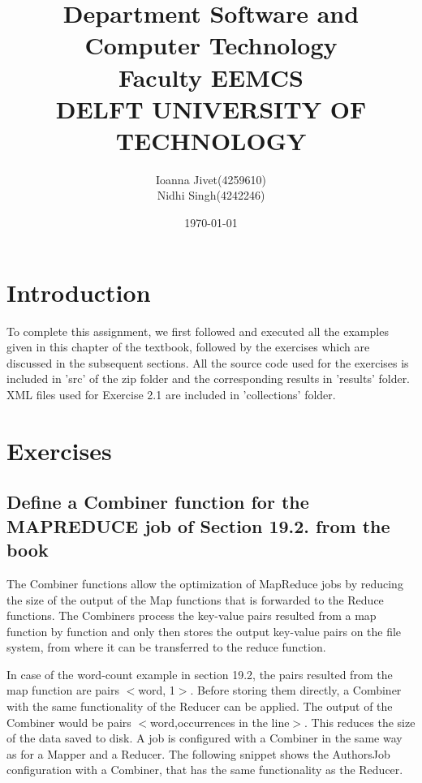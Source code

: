 \documentclass[a4paper,10pt]{article}
\begin{document}
\title{\flushleft\small{Department Software and Computer Technology\\ 
Faculty EEMCS\\
DELFT UNIVERSITY OF TECHNOLOGY\\}
}
\author{Ioanna Jivet(4259610) \\
Nidhi Singh(4242246) }
        
\date{\today}
    
\maketitle

\section{Introduction}
To complete this assignment, we first followed and executed all the examples given in this chapter of the textbook, followed by the exercises which are discussed in the subsequent sections. All the source code used for the exercises is included in 'src' of the zip folder and the corresponding results in 'results' folder. XML files used for Exercise 2.1 are included in 'collections' folder.
\section{Exercises}
\subsection{Define a Combiner function for the MAPREDUCE job of Section 19.2. from the book}

The Combiner functions allow the optimization of MapReduce jobs by reducing the size of the output of the Map functions that is forwarded to the Reduce functions. The Combiners process the key-value pairs resulted from a map function by function and only then stores the output key-value pairs on the file system, from where it can be transferred to the reduce function.

In case of the word-count example in section 19.2, the pairs resulted from the map function are pairs $<$word, 1$>$. Before storing them directly, a Combiner with the same functionality of the Reducer can be applied. The output of the Combiner would be pairs $<$word,occurrences in the line$>$. This reduces the size of the data saved to disk. A job is configured with a Combiner in the same way as for a Mapper and a Reducer. The following snippet shows the AuthorsJob configuration with a Combiner, that has the same functionality as the Reducer. 
\end{document}
